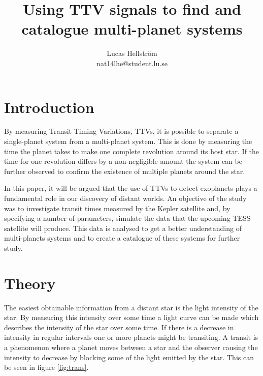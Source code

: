 \documentclass[titlepage]{article}
\title{Using TTV signals to find and catalogue multi-planet systems}
\author{Lucas Hellström\\ \small{nat14lhe@student.lu.se}}
\date{}
\begin{document}
\maketitle

\section{Introduction}
	By measuring Transit Timing Variations, TTVs, it is possible to separate a single-planet system from a multi-planet system. This is done by measuring the time the planet takes to make one complete revolution around its host star. If the time for one revolution differs by a non-negligible amount the system can be further observed to confirm the existence of multiple planets around the star. 
	
	In this paper, it will be argued that the use of TTVs to detect exoplanets plays a fundamental role in our discovery of distant worlds. An objective of the study was to investigate transit times measured by the Kepler satellite and, by specifying a number of parameters, simulate the data that the upcoming TESS satellite will produce. This data is analysed to get a better understanding of multi-planets systems and to create a catalogue of these systems for further study. 
	
	
\section{Theory}
	The easiest obtainable information from a distant star is the light intensity of the star. By measuring this intensity over some time a light curve can be made which describes the intensity of the star over some time. If there is a decrease in intensity in regular intervals one or more planets might be transiting. A transit is a phenomenon where a planet moves between a star and the observer causing the intensity to decrease by blocking some of the light emitted by the star. This can be seen in figure \ref{fig:trans}.
	
\end{document}
